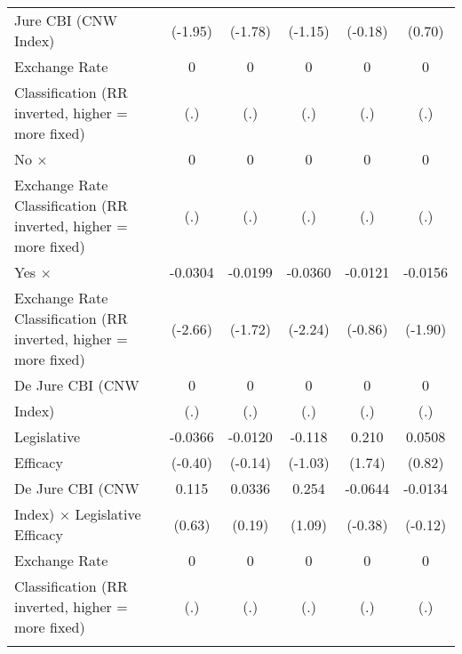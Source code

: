{\begin{tabular}{l*{5}{c}}
Jure CBI (CNW Index)&  (-1.95)         &  (-1.78)         &  (-1.15)         &  (-0.18)         &   (0.70)         \\
\addlinespace
Exchange Rate   &        0         &        0         &        0         &        0         &        0         \\
Classification (RR inverted, higher = more fixed)&      (.)         &      (.)         &      (.)         &      (.)         &      (.)         \\
\addlinespace
No $\times$     &        0         &        0         &        0         &        0         &        0         \\
Exchange Rate Classification (RR inverted, higher = more fixed)&      (.)         &      (.)         &      (.)         &      (.)         &      (.)         \\
\addlinespace
Yes $\times$    &  -0.0304\sym{**} &  -0.0199         &  -0.0360\sym{*}  &  -0.0121         &  -0.0156         \\
Exchange Rate Classification (RR inverted, higher = more fixed)&  (-2.66)         &  (-1.72)         &  (-2.24)         &  (-0.86)         &  (-1.90)         \\
\addlinespace
De Jure CBI (CNW&        0         &        0         &        0         &        0         &        0         \\
Index)          &      (.)         &      (.)         &      (.)         &      (.)         &      (.)         \\
\addlinespace
Legislative     &  -0.0366         &  -0.0120         &   -0.118         &    0.210         &   0.0508         \\
Efficacy        &  (-0.40)         &  (-0.14)         &  (-1.03)         &   (1.74)         &   (0.82)         \\
\addlinespace
De Jure CBI (CNW&    0.115         &   0.0336         &    0.254         &  -0.0644         &  -0.0134         \\
Index) $\times$ Legislative Efficacy&   (0.63)         &   (0.19)         &   (1.09)         &  (-0.38)         &  (-0.12)         \\
\addlinespace
Exchange Rate   &        0         &        0         &        0         &        0         &        0         \\
Classification (RR inverted, higher = more fixed)&      (.)         &      (.)         &      (.)         &      (.)         &      (.)         \\
\addlinespace

\end{tabular}}

